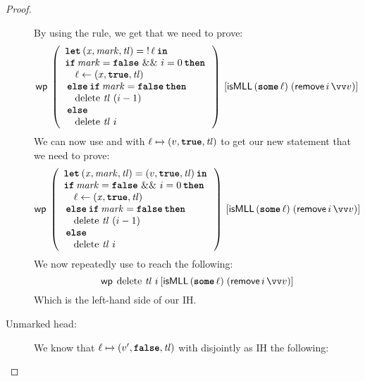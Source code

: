 \documentclass[thesis.tex]{subfiles}
\begin{document}
\begin{proof}
\begin{description}
      By using the  rule, we get that we need to prove:
      \[\wpre{
          \left(
          \begin{array}{l}
              \Let (\lvar, \langv{mark}, \langv{tl}) = \deref \loc in \\
              \If \langv{mark} = \False\ \&\&\ \iindex = 0 then       \\
              \quad \loc \gets (\lvar, \True, \langv{tl})             \\
              \Else \If \langv{mark} = \False then                    \\
              \quad \MLLdelete\,\langv{tl}\ (\iindex - 1)             \\
              \Else                                                   \\
              \quad \MLLdelete\,\langv{tl}\ \iindex
            \end{array}
          \right)
        }{\isMLL\, (\Some \loc)\; (\textlog{remove}\, \iindex\, \vect{v})}\]
      We can now use  and  with $\loc \fmapsto (\val, \True, \langv{tl})$ to get our new statement that we need to prove:
      \[
        \wpre{\left(
          \begin{array}{l}
              \Let (\lvar, \langv{mark}, \langv{tl}) = (\val, \True, \langv{tl}) in \\
              \If \langv{mark} = \False\ \&\&\ \iindex = 0 then                     \\
              \quad \loc \gets (\lvar, \True, \langv{tl})                           \\
              \Else \If \langv{mark} = \False then                                  \\
              \quad \MLLdelete\,\langv{tl}\ (\iindex - 1)                           \\
              \Else                                                                 \\
              \quad \MLLdelete\,\langv{tl}\ \iindex
            \end{array}
          \right)}{\isMLL\, (\Some \loc)\; (\textlog{remove}\, \iindex\, \vect{v})}
      \]
      We now repeatedly use  to reach the following:
      \[
        \wpre{\MLLdelete\,\langv{tl}\ \iindex}{\isMLL\, (\Some \loc)\; (\textlog{remove}\, \iindex\, \vect{\val})}
      \]
      Which is the left-hand side of our IH.
    \item[Unmarked head:] We know that $\loc \fmapsto (\val', \False, \langv{tl})$ with disjointly as IH the following:

\end{description}
\end{proof}
\end{document}
